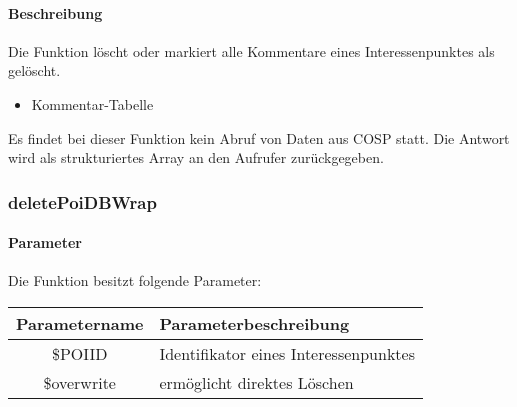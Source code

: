 \paragraph{Beschreibung} Die Funktion löscht oder markiert alle Kommentare eines Interessenpunktes als gelöscht.
\begin{itemize}
	\item Kommentar-Tabelle
\end{itemize}
Es findet bei dieser Funktion kein Abruf von Daten aus {\glqq COSP\grqq} statt. Die Antwort wird als strukturiertes Array an den Aufrufer zurückgegeben.
\subsubsection{deletePoiDBWrap}
\paragraph{Parameter} Die Funktion besitzt folgende Parameter:
\begin{table}[H]
	\begin{tabular}{|c|p{11cm}|}
		\hline
		\textbf{Parametername} & \textbf{Parameterbeschreibung} \\ \hline
		\$POIID     & Identifikator eines Interessenpunktes \\ \hline
		\$overwrite & ermöglicht direktes Löschen \\ \hline
	\end{tabular}
\end{table}
